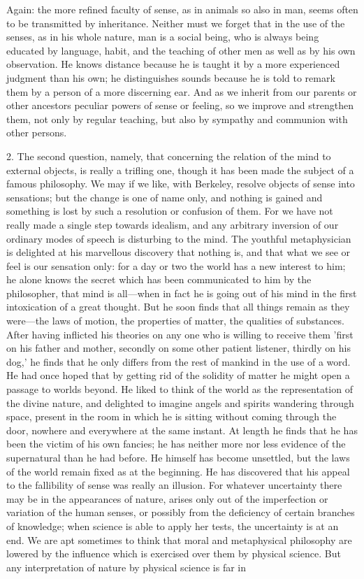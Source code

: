 \documentclass[11pt,letter]{article}
\begin{document}
\par  Again: the more refined faculty of sense, as in animals so also in man, seems often to be transmitted by inheritance. Neither must we forget that in the use of the senses, as in his whole nature, man is a social being, who is always being educated by language, habit, and the teaching of other men as well as by his own observation. He knows distance because he is taught it by a more experienced judgment than his own; he distinguishes sounds because he is told to remark them by a person of a more discerning ear. And as we inherit from our parents or other ancestors peculiar powers of sense or feeling, so we improve and strengthen them, not only by regular teaching, but also by sympathy and communion with other persons.

\par  2. The second question, namely, that concerning the relation of the mind to external objects, is really a trifling one, though it has been made the subject of a famous philosophy. We may if we like, with Berkeley, resolve objects of sense into sensations; but the change is one of name only, and nothing is gained and something is lost by such a resolution or confusion of them. For we have not really made a single step towards idealism, and any arbitrary inversion of our ordinary modes of speech is disturbing to the mind. The youthful metaphysician is delighted at his marvellous discovery that nothing is, and that what we see or feel is our sensation only: for a day or two the world has a new interest to him; he alone knows the secret which has been communicated to him by the philosopher, that mind is all—when in fact he is going out of his mind in the first intoxication of a great thought. But he soon finds that all things remain as they were—the laws of motion, the properties of matter, the qualities of substances. After having inflicted his theories on any one who is willing to receive them 'first on his father and mother, secondly on some other patient listener, thirdly on his dog,' he finds that he only differs from the rest of mankind in the use of a word. He had once hoped that by getting rid of the solidity of matter he might open a passage to worlds beyond. He liked to think of the world as the representation of the divine nature, and delighted to imagine angels and spirits wandering through space, present in the room in which he is sitting without coming through the door, nowhere and everywhere at the same instant. At length he finds that he has been the victim of his own fancies; he has neither more nor less evidence of the supernatural than he had before. He himself has become unsettled, but the laws of the world remain fixed as at the beginning. He has discovered that his appeal to the fallibility of sense was really an illusion. For whatever uncertainty there may be in the appearances of nature, arises only out of the imperfection or variation of the human senses, or possibly from the deficiency of certain branches of knowledge; when science is able to apply her tests, the uncertainty is at an end. We are apt sometimes to think that moral and metaphysical philosophy are lowered by the influence which is exercised over them by physical science. But any interpretation of nature by physical science is far in 
\end{document}
